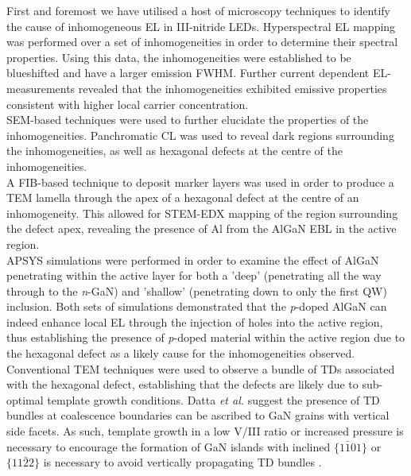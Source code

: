 First and foremost we have utilised a host of microscopy techniques to identify the cause of inhomogeneous EL in III-nitride LEDs. Hyperspectral EL mapping was performed over a set of inhomogeneities in order to determine their spectral properties. Using this data, the inhomogeneities were established to be blueshifted and have a larger emission FWHM. Further current dependent EL-measurements revealed that the inhomogeneities exhibited emissive properties consistent with higher local carrier concentration.\\
SEM-based techniques were used to further elucidate the properties of the inhomogeneities. Panchromatic CL was used to reveal dark regions surrounding the inhomogeneities, as well as hexagonal defects at the centre of the inhomogeneities.\\
A FIB-based technique to deposit marker layers was used in order to produce a TEM lamella through the apex of a hexagonal defect at the centre of an inhomogeneity. This allowed for STEM-EDX mapping of the region surrounding the defect apex, revealing the presence of Al from the AlGaN EBL in the active region.\\
APSYS simulations were performed in order to examine the effect of AlGaN penetrating within the active layer for both a 'deep' (penetrating all the way through to the \textit{n}-GaN) and 'shallow' (penetrating down to only the first QW) inclusion. Both sets of simulations demonstrated that the \textit{p}-doped AlGaN can indeed enhance local EL through the injection of holes into the active region, thus establishing the presence of \textit{p}-doped material within the active region due to the hexagonal defect as a likely cause for the inhomogeneities observed.\\
Conventional TEM techniques were used to observe a bundle of TDs associated with the hexagonal defect, establishing that the defects are likely due to sub-optimal template growth conditions. Datta \textit{et al.} suggest the presence of TD bundles at coalescence boundaries can be ascribed to GaN grains with vertical side facets. As such, template growth in a low V/III ratio or increased pressure is necessary to encourage the formation of GaN islands with inclined $\{1\bar{1}01\}$ or $\{11\bar{2}2\}$ is necessary to avoid vertically propagating TD bundles \cite{Datta2004}.


